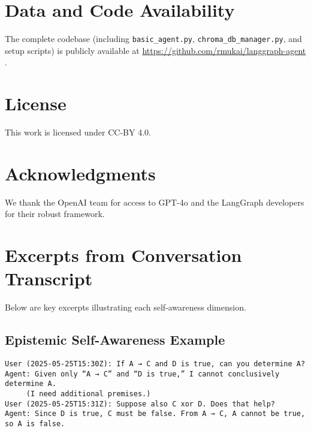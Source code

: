 \documentclass[11pt]{article}
\begin{document}
\section*{Data and Code Availability}
The complete codebase (including \texttt{basic\_agent.py}, \texttt{chroma\_db\_manager.py}, and setup scripts) is publicly available at \url{https://github.com/rmukai/langgraph-agent} \cite{LangGraphAgent2025}.

\section*{License}
This work is licensed under CC-BY 4.0.

\section*{Acknowledgments}
We thank the OpenAI team for  access to GPT-4o and the LangGraph developers for their robust framework.

\appendix
\section{Excerpts from Conversation Transcript}
Below are key excerpts illustrating each self-awareness dimension.

\subsection{Epistemic Self-Awareness Example}
\begin{verbatim}
User (2025-05-25T15:30Z): If A → C and D is true, can you determine A?
Agent: Given only “A → C” and “D is true,” I cannot conclusively determine A.
     (I need additional premises.)
User (2025-05-25T15:31Z): Suppose also C xor D. Does that help?
Agent: Since D is true, C must be false. From A → C, A cannot be true, so A is false.
\end{verbatim}
\end{document}
